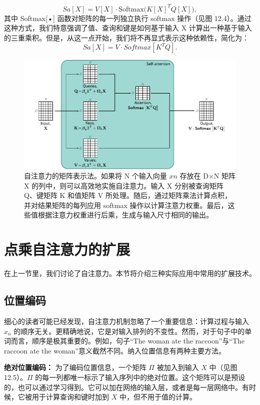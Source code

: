 \documentclass[lang=cn,newtx,10pt,scheme=chinese]{elegantbook}
\begin{document}
\begin{equation}
Sa[X] = V[X] \cdot \text{Softmax} \big( K[X]^T Q[X] \big), 
\end{equation}
其中 Softmax[•] 函数对矩阵的每一列独立执行 softmax 操作（见图 12.4）。通过这种方式，我们特意强调了值、查询和键是如何基于输入 X 计算出一种基于输入的三重乘积。但是，从这一点开始，我们将不再显式表示这种依赖性，简化为：
\begin{equation}
Sa[X] = V · Softmax[K^T Q]. 
\end{equation}
\begin{figure}[ht!]
\centering
\includegraphics[width=0.7\linewidth]{PDFFigures/UDLChap12PDF/TransformerBlockSA.pdf}
\caption{自注意力的矩阵表示法。如果将 N 个输入向量 \(xn\) 存放在 D×N 矩阵 X 的列中，则可以高效地实施自注意力。输入 X 分别被查询矩阵 Q、键矩阵 K 和值矩阵 V 所处理。随后，通过矩阵乘法计算点积，并对结果矩阵的每列应用 softmax 操作以计算注意力权重。最后，这些值根据注意力权重进行后乘，生成与输入尺寸相同的输出。}
\end{figure}


\section{点乘自注意力的扩展}
在上一节里，我们讨论了自注意力。本节将介绍三种实际应用中常用的扩展技术。

\subsection{位置编码}
细心的读者可能已经发现，自注意力机制忽略了一个重要信息：计算过程与输入 \(x_n\) 的顺序无关。更精确地说，它是对输入排列的不变性。然而，对于句子中的单词而言，顺序是极其重要的。例如，句子“The woman ate the raccoon”与“The raccoon ate the woman”意义截然不同。纳入位置信息有两种主要方法。

\textbf{绝对位置编码：} 为了编码位置信息，一个矩阵 \(\Pi\) 被加入到输入 \(X\) 中（见图 12.5）。\(\Pi\) 的每一列都唯一标示了输入序列中的绝对位置。这个矩阵可以是预设的，也可以通过学习得到。它可以加在网络的输入层，或者是每一层网络中。有时候，它被用于计算查询和键时加到 \(X\) 中，但不用于值的计算。
\end{document}
